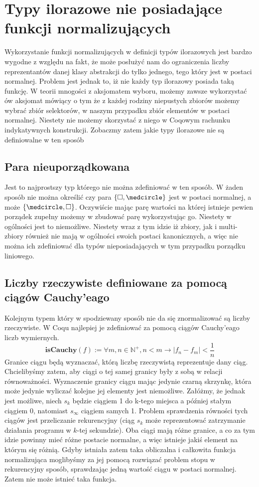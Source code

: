 \section{Typy ilorazowe nie posiadające funkcji normalizujących}
Wykorzystanie funkcji normalizujących w definicji typów ilorazowych jest bardzo wygodne z względu na fakt, że może posłużyć nam do ograniczenia liczby reprezentantów danej klasy abstrakcji do tylko jednego, tego który jest w postaci normalnej. Problem jest jednak to, iż nie każdy typ ilorazowy posiada taką funkcję. W teorii mnogości z aksjomatem wyboru, możemy zawsze wykorzystać ów aksjomat mówiący o tym że z każdej rodziny niepustych zbiorów możemy wybrać zbiór selektorów, w naszym przypadku zbiór elementów w postaci normalnej. Niestety nie możemy skorzystać z niego w Coqowym rachunku indykatywnych konstrukcji. Zobaczmy zatem jakie typy ilorazowe nie są definiowalne w ten sposób
\subsection{Para nieuporządkowana}
Jest to najprostszy typ którego nie można zdefiniować w ten sposób. W żaden sposób nie można określić czy para $\{	\square, \medcircle \}$ jest w postaci normalnej, a może $\{ \medcircle , \square \}$. Oczywiście mając parę wartości na której istnieje pewien porządek zupełny możemy w zbudować parę wykorzystując go. Niestety w ogólności jest to niemożliwe. Niestety wraz z tym idzie iż zbiory, jak i multi-zbiory również nie mają w ogólności swoich postaci kanonicznych, a więc nie można ich zdefiniować dla typów nieposiadających w tym przypadku porządku liniowego.
\subsection{Liczby rzeczywiste definiowane za pomocą ciągów Cauchy'eago}
Kolejnym typem który w spodziewany sposób nie da się znormalizować są liczby rzeczywiste. W Coqu najlepiej je zdefiniować za pomocą ciągów Cauchy'eago liczb wymiernych.
\begin{equation}
    \textbf{isCauchy}(f) := \forall m, n \in \mathbb{N}^+, n < m \rightarrow |f_n - f_m| < \frac{1}{n}
\end{equation}
Granice ciągu będą wyznaczać, którą liczbę rzeczywistą reprezentuje dany ciąg. Chcielibyśmy zatem, aby ciągi o tej samej granicy były z sobą w relacji równoważności. Wyznaczenie granicy ciągu mając jedynie czarną skrzynkę, która może jedynie wyliczać kolejne jej elementy jest niemożliwe. Załóżmy, że jednak jest możliwe, niech $s_k$ będzie ciągiem 1 do k-tego miejsca a później stałym ciągiem 0, natomiast $s_\infty$ ciągiem samych 1. Problem sprawdzenia równości tych ciągów jest przeliczanie rekurencyjny (ciąg $s_k$ może reprezentować zatrzymanie działania programu w $k$-tej sekundzie). Oba ciągi mają różne granice, a co za tym idzie powinny mieć różne postacie normalne, a więc istnieje jakiś element na którym się różnią. Gdyby istniała zatem taka obliczalna i całkowita funkcja normalizująca moglibyśmy za jej pomocą rozwiązać problem stopu w rekurencyjny sposób, sprawdzając jedną wartość ciągu w postaci normalnej. Zatem nie może istnieć taka funkcja.
